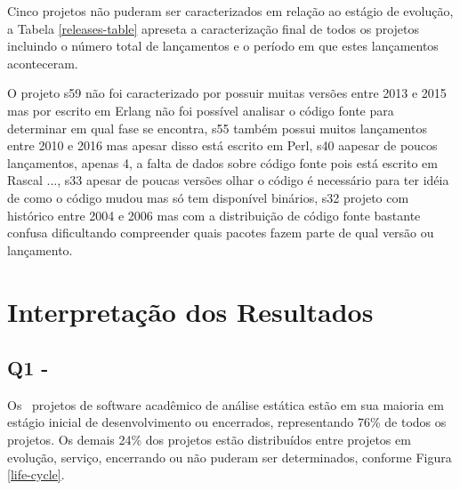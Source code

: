 

Cinco projetos não puderam ser caracterizados em relação ao estágio de
evolução, a Tabela \ref{releases-table} apreseta a caracterização final de
todos os projetos incluindo o número total de lançamentos e o período em que
estes lançamentos aconteceram.



O projeto s59 não foi caracterizado por possuir muitas versões entre 2013 e
2015 mas por escrito em Erlang não foi possível analisar o código fonte para
determinar em qual fase se encontra, s55 também possui muitos lançamentos entre
2010 e 2016 mas apesar disso está escrito em Perl, s40 aapesar de poucos
lançamentos, apenas 4, a falta de dados sobre código fonte pois está escrito em
Rascal ..., s33 apesar de poucas versões olhar o código é necessário para ter
idéia de como o código mudou mas só tem disponível binários, s32 projeto com
histórico entre 2004 e 2006 mas com a distribuição de código fonte bastante
confusa dificultando compreender quais pacotes fazem parte de qual versão ou
lançamento.


\section{Interpretação dos Resultados} \label{estudo3:interpretacao} %

\subsection{Q1 - \EstudoTresQuestaoUm}

Os \SoftwareCount \ projetos de software acadêmico de análise estática estão em
sua maioria em estágio inicial de desenvolvimento ou encerrados, representando
76\% de todos os projetos. Os demais 24\% dos projetos estão distribuídos entre
projetos em evolução, serviço, encerrando ou não puderam ser determinados,
conforme Figura \ref{life-cycle}.

